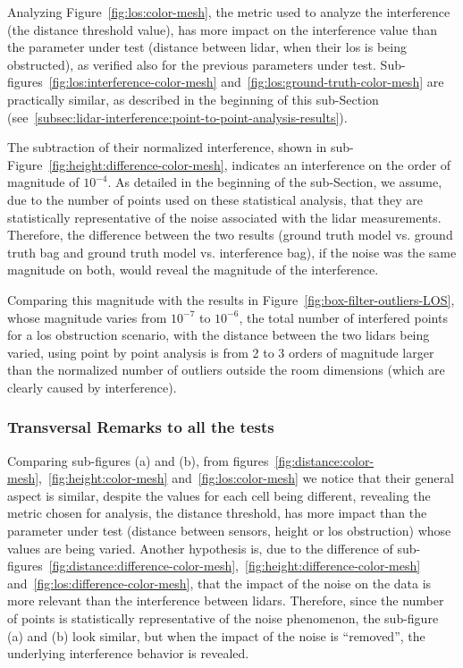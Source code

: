 Analyzing Figure~\ref{fig:los:color-mesh}, the metric used to analyze the interference (the distance threshold value), has more impact on the interference value than the parameter under test (distance between \ac{lidar}, when their \ac{los} is being obstructed), as verified also for the previous parameters under test. Sub-figures~\ref{fig:los:interference-color-mesh} and~\ref{fig:los:ground-truth-color-mesh} are practically similar, as described in the beginning of this sub-Section (see~\ref{subsec:lidar-interference:point-to-point-analysis-results}).

The subtraction of their normalized interference, shown in sub-Figure~\ref{fig:height:difference-color-mesh}, indicates an interference on the order of magnitude of $10^{-4}$. As detailed in the beginning of the sub-Section, we assume, due to the number of points used on these statistical analysis, that they are statistically representative of the noise associated with the \ac{lidar} measurements. Therefore, the difference between the two results (ground truth model vs. ground truth bag and ground truth model vs. interference bag), if the noise was the same magnitude on both, would reveal the magnitude of the interference. 

Comparing this magnitude with the results in Figure~\ref{fig:box-filter-outliers-LOS}, whose magnitude varies from $10^{-7}$ to $10^{-6}$, the total number of interfered points for a \ac{los} obstruction scenario, with the distance between the two \acp{lidar} being varied, using point by point analysis is from 2 to 3 orders of magnitude larger than the normalized number of outliers outside the room dimensions (which are clearly caused by interference).


\subsubsection{Transversal Remarks to all the tests}
Comparing sub-figures (a) and (b), from figures~\ref{fig:distance:color-mesh},~\ref{fig:height:color-mesh} and~\ref{fig:los:color-mesh} we notice that their general aspect is similar, despite the values for each cell being different, revealing the metric chosen for analysis, the distance threshold, has
more impact than the parameter under test (distance between sensors, height or \ac{los} obstruction) whose values are being varied. Another hypothesis is, due to the difference of sub-figures~\ref{fig:distance:difference-color-mesh},~\ref{fig:height:difference-color-mesh} and~\ref{fig:los:difference-color-mesh}, that the impact of the noise on the data is more relevant than the interference between \acp{lidar}. Therefore, since the number of points is statistically representative of the noise phenomenon, the sub-figure (a) and (b) look similar, but when the impact of the noise is ``removed'', the underlying interference behavior is revealed. 

